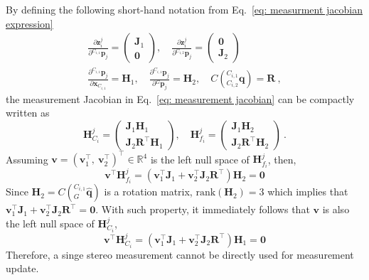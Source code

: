 \section{}
\label{sec: nullify measurement jacobian}
By defining the following short-hand notation from Eq.~\eqref{eq: measurment jacobian expression}
\begin{equation*}
\begin{gathered}
\frac{\partial \mathbf{z}_i^j}{\partial {}^{C_{i,1}}\mathbf{p}_j} = 
\begin{pmatrix}
\mathbf{J}_1 \\ \mathbf{0}
\end{pmatrix}, \quad
\frac{\partial \mathbf{z}_i^j}{\partial {}^{C_{i,2}}\mathbf{p}_j} = 
\begin{pmatrix}
\mathbf{0} \\ \mathbf{J}_2
\end{pmatrix}\\
\frac{\partial {}^{C_{i,1}}\mathbf{p}_j}{\partial \mathbf{x}_{C_{i,1}}} = 
\mathbf{H}_1, \quad 
\frac{\partial {}^{C_{i,1}}\mathbf{p}_j}{\partial {}^G\mathbf{p}_j} = 
\mathbf{H}_2, \quad
C\left({}^{C_{i,1}}_{C_{i,2}}\mathbf{q}\right) = 
\mathbf{R}\ ,
\end{gathered}
\end{equation*}
the measurement Jacobian in Eq.~\eqref{eq: measurement jacobian} can be compactly written as
\begin{equation*}
\mathbf{H}_{C_i}^j = 
\begin{pmatrix}
\mathbf{J}_1 \mathbf{H}_1 \\
\mathbf{J}_2 \mathbf{R}^\top \mathbf{H}_1
\end{pmatrix},\quad
\mathbf{H}_{f_i}^j =
\begin{pmatrix}
\mathbf{J}_1 \mathbf{H}_2 \\
\mathbf{J}_2 \mathbf{R}^\top \mathbf{H}_2
\end{pmatrix}\ .
\end{equation*}
Assuming $\mathbf{v} = \left(\mathbf{v}_1^\top,\ \mathbf{v}_2^\top\right)^\top\in\mathbb{R}^4$ is the left null space of $\mathbf{H}_{f_i}^j$, then,
\begin{equation*}
\mathbf{v}^\top \mathbf{H}_{f_i}^j  = 
\left(\mathbf{v}_1^\top \mathbf{J}_1 + 
\mathbf{v}_2^\top\mathbf{J}_2\mathbf{R}^\top\right) 
\mathbf{H}_2 = \mathbf{0}
\end{equation*}
Since $\mathbf{H}_2 = C\left({}^{C_{i,1}}_G\hat{\mathbf{q}}\right)$ is a rotation matrix, $\text{rank}\left(\mathbf{H}_2\right) = 3$ which implies that $\mathbf{v}_1^\top \mathbf{J}_1 + \mathbf{v}_2^\top\mathbf{J}_2\mathbf{R}^\top = \mathbf{0}$. With such property, it immediately follows that $\mathbf{v}$ is also the left null space of $\mathbf{H}_{C_i}^j$, 
\begin{equation*}
\mathbf{v}^\top \mathbf{H}_{C_i}^j = 
\left(\mathbf{v}_1^\top \mathbf{J}_1 + 
\mathbf{v}_2^\top\mathbf{J}_2\mathbf{R}^\top\right) 
\mathbf{H}_1 = \mathbf{0}
\end{equation*}
Therefore, a singe stereo measurement cannot be directly used for measurement update.

